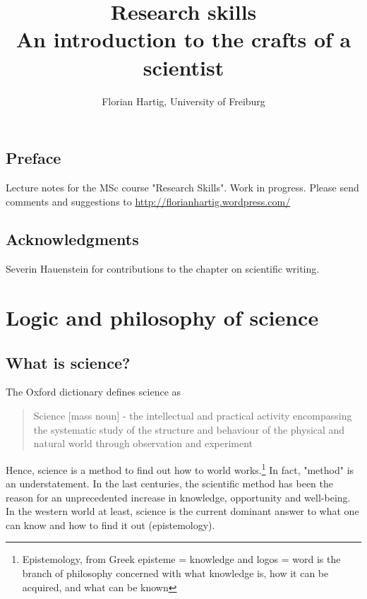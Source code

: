 \documentclass{tufte-book}
\title{Research skills\\
\large{An introduction to the crafts of a scientist}}
\author{Florian Hartig, University of Freiburg}
\begin{document}
\let\cleardoublepage\clearpage
\maketitle
\newpage
\tableofcontents

\newpage


\section*{Preface}

Lecture notes for the MSc course "Research Skills". Work in progress. Please send comments and suggestions to \href{http://florianhartig.wordpress.com/}{http://florianhartig.wordpress.com/}


\section*{Acknowledgments}

Severin Hauenstein for contributions to the chapter on scientific writing.

\chapter{Logic and philosophy of science}

\section{What is science?}

The Oxford dictionary defines science as 

\begin{quote}
Science [mass noun] - the intellectual and practical activity encompassing the systematic study of the structure and behaviour of the physical and natural world through observation and experiment
\end{quote}

Hence, science is a method to find out how to world works.\footnote{Epistemology, from Greek episteme = knowledge and logos = word is the branch of philosophy concerned with what knowledge is, how it can be acquired, and what can be known} In fact, "method" is an understatement. In the last centuries, the scientific method has been the reason for an unprecedented increase in knowledge, opportunity and well-being. In the western world at least, science is the current dominant answer to what one can know and how to find it out (epistemology). 
\end{document}
